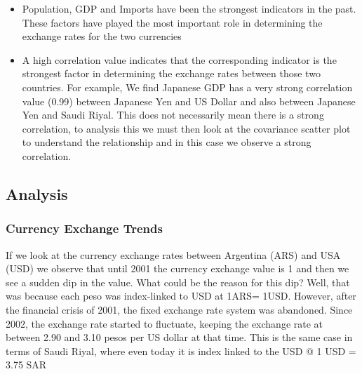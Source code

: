 \begin{itemize}
\item Population, GDP and Imports have been the strongest indicators in the past\cite{edwards2006relationship}. These factors have played the most important role in determining the exchange rates for the two currencies
\item A high correlation value indicates that the corresponding indicator is the strongest factor in determining the exchange rates between those two countries\cite{burstein2005large}. For example, We find Japanese GDP has a very strong correlation value (0.99) between Japanese Yen and US Dollar and also between Japanese Yen and Saudi Riyal.  This does not necessarily mean there is a strong correlation, to analysis this we must then look at the covariance scatter plot to understand the relationship and in this case we observe a strong correlation.


\end{itemize}
\subsection{Analysis}
\subsubsection{Currency Exchange Trends}
If we look at the currency exchange rates between Argentina (ARS) and USA (USD) we observe that until 2001 the currency exchange value is 1 and then we see a sudden dip in the value. What could be the reason for this dip? Well, that was because each peso was index-linked to USD at 1ARS= 1USD. However, after the financial crisis of 2001, the fixed exchange rate system was abandoned. Since 2002, the exchange rate started to fluctuate, keeping the exchange rate at between 2.90 and 3.10 pesos per US dollar at that time.  
This is the same case in terms of Saudi Riyal, where even today it is index linked to the USD @ 1 USD = 3.75 SAR 
